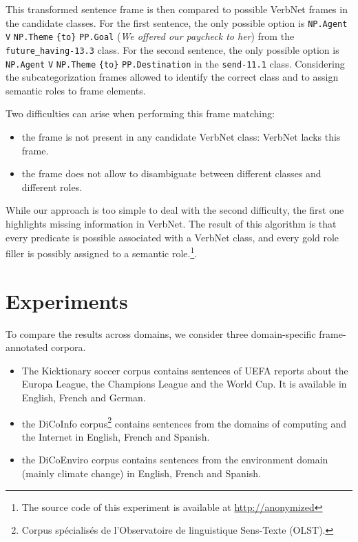 This transformed sentence frame is then compared to possible VerbNet frames in
the candidate classes. For the first sentence, the only possible option is
\texttt{NP.Agent} \texttt{V} \texttt{NP.Theme} \texttt{\{to\}} \texttt{PP.Goal}
(\textit{We offered our paycheck to her}) from the \texttt{future\_having-13.3}
class. For the second sentence, the only possible option is \texttt{NP.Agent}
\texttt{V} \texttt{NP.Theme} \texttt{\{to\}} \texttt{PP.Destination} in the
\texttt{send-11.1} class. Considering the subcategorization frames allowed to
identify the correct class and to assign semantic roles to frame elements.

Two difficulties can arise when performing this frame matching:
\begin{itemize}
    \item the frame is not present in any candidate VerbNet class: VerbNet lacks this frame.
    \item the frame does not allow to disambiguate between different classes and different roles.
\end{itemize}

While our approach is too simple to deal with the second difficulty, the first
one highlights missing information in VerbNet. The result of this algorithm is
that every predicate is possible associated with a VerbNet class, and every
gold role filler is possibly assigned to a semantic role.\footnote{The source
code of this experiment is available at \url{http://anonymized}}.

\section{Experiments}

To compare the results across domains, we consider three domain-specific
frame-annotated corpora.

\begin{itemize}

\item The Kicktionary soccer corpus \cite{schmidt2009kicktionary} contains
sentences of UEFA reports about the Europa League, the Champions League and the
World Cup. It is available in English, French and German.

\item the DiCoInfo corpus\footnote{\label{olst}Corpus spécialisés de
l'Observatoire de linguistique Sens-Texte (OLST).} contains sentences from the
domains of computing and the Internet in English, French and Spanish.

\item the DiCoEnviro\cite{corpusolst} corpus contains sentences from the
environment domain (mainly climate change) in English, French and Spanish.

\end{itemize}

